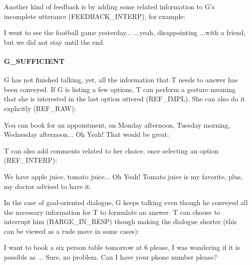 						Another kind of feedback is by adding some related information to G's incomplete utterance (FEEDBACK\_INTERP), for example:
						
						\begin{dialogue}
							 I went to see the football game yesterday...
							 ...yeah, disappointing
							 ...with a friend, but we did not stay until the end.
						\end{dialogue}
                        
                   	\paragraph{G\_SUFFICIENT} G has not finished talking, yet, all the information that T needs to answer has been conveyed. If G is listing a few options, T can perform a gesture meaning that she is interested in the last option uttered (REF\_IMPL). She can also do it explicitly (REF\_RAW):
                    
                    	\begin{dialogue}
							 You can book for an appointment, on Monday afternoon, Tuesday morning, Wednesday afternoon...
							 Oh Yeah! That would be great.
						\end{dialogue}
                        
                   	T can also add comments related to her choice, once selecting an option (REF\_INTERP):
                    
                    	\begin{dialogue}
							 We have apple juice, tomato juice...
							 Oh Yeah! Tomato juice is my favorite, plus, my doctor advised to have it.
						\end{dialogue}
                    
                    In the case of goal-oriented dialogue, G keeps talking even though he conveyed all the necessary information for T to formulate an answer. T can choose to interrupt him (BARGE\_IN\_RESP) though making the dialogue shorter (this can be viewed as a rude move in some cases):
                    
                 		\begin{dialogue}
							 I want to book a six person table tomorrow at 6 please, I was wondering if it is possible as ...
							 Sure, no problem. Can I have your phone number please?
						\end{dialogue}
                        
